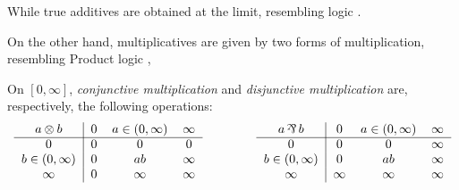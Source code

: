 While true additives are obtained at the limit, resembling \godel{} logic \citep{prooffuzzy}.


On the other hand, multiplicatives are given by two forms of multiplication, resembling Product logic \citep{prooffuzzy},

\begin{definition}[Multiplication]
\label{Multiplication}
    On $[0,\infty]$, \emph{conjunctive multiplication} and \emph{disjunctive multiplication} are, respectively, the following operations:
    \begin{equation*}
		\begin{tabular}{c|ccc}
			$a \conmul{} b$ & $0$ & $a \in (0,\infty)$ & $\infty$\\
			\cline{1-4}
			$0$ 			   & $0$ & $0$ 		& $0$\\
			$b \in (0,\infty)$ & $0$ & $ab$		& $\infty$\\
			$\infty$ 		   & $0$ & $\infty$ & $\infty$
		\end{tabular}
		\hspace*{10ex}
		\begin{tabular}{c|ccc}
			\textnormal{$a \dismul{} b$} & $0$ & $a \in (0,\infty)$ & $\infty$\\
			\cline{1-4}
			$0$ 		 	   & $0$ 		& $0$ 	   & $\infty$\\
			$b \in (0,\infty)$ & $0$ 		& $ab$	   & $\infty$\\
			$\infty$ 		   & $\infty$ 	& $\infty$ & $\infty$
		\end{tabular}
	\end{equation*}
\end{definition}

